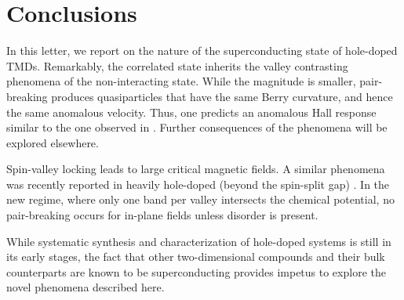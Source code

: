 \section{Conclusions}

In this letter, we report on the nature of the superconducting state
of hole-doped TMDs.
Remarkably, the correlated state inherits
the valley contrasting phenomena of the non-interacting state.
While the magnitude is smaller, pair-breaking produces quasiparticles
that have the same Berry curvature, and hence the same anomalous velocity.
Thus, one predicts an anomalous Hall response similar to
the one observed in .
Further consequences of the phenomena will be explored elsewhere.

Spin-valley locking leads to large critical magnetic fields.
A similar phenomena was recently reported in heavily hole-doped
(beyond the spin-split gap) 
\cite{%
  1510.06289v2,%
  PhysRevLett.113.097001%
}.
In the new regime, where only one band per valley intersects
the chemical potential, no pair-breaking occurs
for in-plane fields unless disorder is present.

While systematic synthesis and characterization of hole-doped systems
is still in its early stages, the fact that other two-dimensional compounds
and their bulk counterparts are known to be superconducting
\cite{%
  PhysRevB.88.054515%
}
provides impetus to explore the novel phenomena described here.
